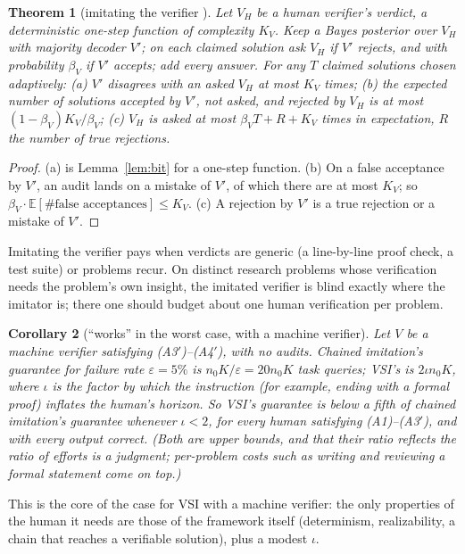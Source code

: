 \documentclass[11pt]{article}
\newtheorem{theorem}{Theorem}[section]
\newtheorem{corollary}[theorem]{Corollary}
\theoremstyle{definition}
\theoremstyle{remark}
\newcommand{\K}{K}
\newcommand{\Ex}{\mathbb{E}}
\begin{document}
\begin{theorem}[imitating the verifier \cite{threadQ}]\label{thm:imitated-verifier}
Let $V_H$ be a human verifier's verdict, a deterministic one-step function of complexity $\K_V$. Keep a Bayes posterior over $V_H$ with majority decoder $V'$; on each claimed solution ask $V_H$ if $V'$ rejects, and with probability $\beta_V$ if $V'$ accepts; add every answer. For any $T$ claimed solutions chosen adaptively: (a) $V'$ disagrees with an asked $V_H$ at most $\K_V$ times; (b) the expected number of solutions accepted by $V'$, not asked, and rejected by $V_H$ is at most $(1-\beta_V)\K_V/\beta_V$; (c) $V_H$ is asked at most $\beta_V T+R+\K_V$ times in expectation, $R$ the number of true rejections.
\end{theorem}
\begin{proof}
(a) is Lemma~\ref{lem:bit} for a one-step function. (b) On a false acceptance by $V'$, an audit lands on a mistake of $V'$, of which there are at most $\K_V$; so $\beta_V\cdot\Ex[\#\text{false acceptances}]\le\K_V$. (c) A rejection by $V'$ is a true rejection or a mistake of $V'$.
\end{proof}

Imitating the verifier pays when verdicts are generic (a line-by-line proof check, a test suite) or problems recur. On distinct research problems whose verification needs the problem's own insight, the imitated verifier is blind exactly where the imitator is; there one should budget about one human verification per problem.

\begin{corollary}[``works'' in the worst case, with a machine verifier]\label{cor:works}
Let $V$ be a machine verifier satisfying (A3$'$)--(A4$'$), with no audits. Chained imitation's guarantee for failure rate $\varepsilon=5\%$ is $n_0\K/\varepsilon=20n_0\K$ task queries; VSI's is $2\iota n_0\K$, where $\iota$ is the factor by which the instruction (for example, ending with a formal proof) inflates the human's horizon. So VSI's guarantee is below a fifth of chained imitation's guarantee whenever $\iota<2$, for every human satisfying (A1)--(A3$'$), and with every output correct. (Both are upper bounds, and that their ratio reflects the ratio of efforts is a judgment; per-problem costs such as writing and reviewing a formal statement come on top.)
\end{corollary}

This is the core of the case for VSI with a machine verifier: the only properties of the human it needs are those of the framework itself (determinism, realizability, a chain that reaches a verifiable solution), plus a modest $\iota$.
\end{document}
